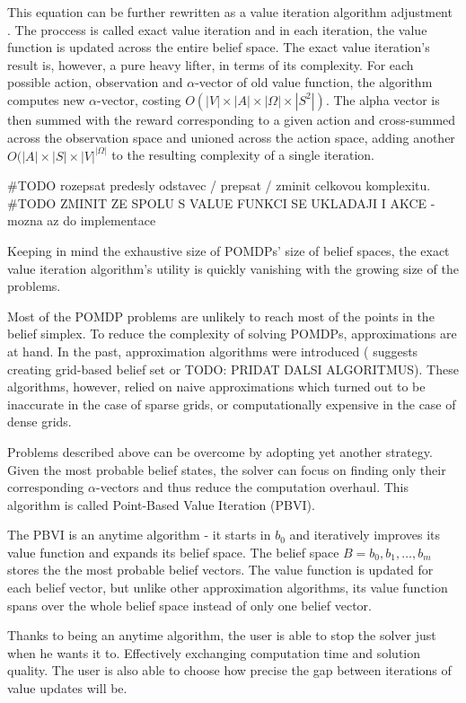 This equation can be further rewritten as a value iteration algorithm adjustment \cite{Shani2013}. The proccess is called exact value iteration and in each iteration, the value function is updated across the entire belief space. The exact value iteration's result is, however, a pure heavy lifter, in terms of its complexity. For each possible action, observation and $\alpha$-vector of old value function, the algorithm computes new $\alpha$-vector, costing $O(|V| \times |A| \times |\Omega| \times |S^2|)$. The alpha vector is then summed with the reward corresponding to a given action and cross-summed across the observation space and unioned across the action space, adding another $O(|A| \times |S| \times |V|^{|\Omega|}$ to the resulting complexity of a single iteration. 

#TODO rozepsat predesly odstavec / prepsat / zminit celkovou komplexitu.
#TODO ZMINIT ZE SPOLU S VALUE FUNKCI SE UKLADAJI I AKCE - mozna az do implementace

Keeping in mind the exhaustive size of POMDPs' size of belief spaces, the exact value iteration algorithm's utility is quickly vanishing with the growing size of the problems. 

Most of the POMDP problems are unlikely to reach most of the points in the belief simplex. To reduce the complexity of solving POMDPs, approximations are at hand. In the past, approximation algorithms were introduced (\cite{10.2307/171496} suggests creating grid-based belief set or TODO: PRIDAT DALSI ALGORITMUS). These algorithms, however, relied on naive approximations which turned out to be inaccurate in the case of sparse grids, or computationally expensive in the case of dense grids.

Problems described above can be overcome by adopting yet another strategy. Given the most probable belief states, the solver can focus on finding only their corresponding $\alpha$-vectors and thus reduce the computation overhaul. This algorithm is called Point-Based Value Iteration (PBVI).

The PBVI \cite{pbvi} is an anytime algorithm - it starts in $b_0$ and iteratively improves its value function and expands its belief space. The belief space $B = {b_0, b_1, \ldots, b_m}$ stores the the most probable belief vectors. The value function is updated for each belief vector, but unlike other approximation algorithms, its value function spans over the whole belief space instead of only one belief vector.

Thanks to being an anytime algorithm, the user is able to stop the solver just when he wants it to. Effectively exchanging computation time and solution quality. The user is also able to choose how precise the gap between iterations of value updates will be.


